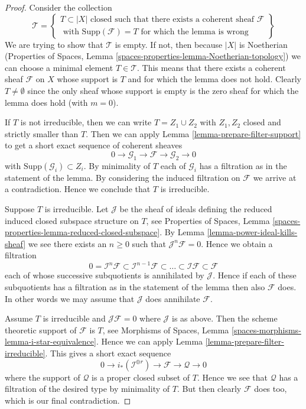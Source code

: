 \documentclass[10pt,a4paper]{amsart}
\theoremstyle{plain}
\theoremstyle{definition}
\theoremstyle{remark}
\numberwithin{equation}{subsection}
\begin{document}
\begin{proof}
Consider the collection
$$
\mathcal{T} =
\left\{
\begin{matrix}
T \subset |X|
\text{ closed such that there exists a coherent sheaf }
\mathcal{F} \\
\text{ with }
\text{Supp}(\mathcal{F}) = T
\text{ for which the lemma is wrong}
\end{matrix}
\right\}
$$
We are trying to show that $\mathcal{T}$ is empty. If not, then
because $|X|$ is Noetherian (Properties of Spaces, Lemma
\ref{spaces-properties-lemma-Noetherian-topology})
we can choose a minimal element $T \in \mathcal{T}$. This means that
there exists a coherent sheaf $\mathcal{F}$ on $X$ whose support is $T$
and for which the lemma does not hold. Clearly $T \not = \emptyset$ since
the only sheaf whose support is empty is the zero sheaf for which the
lemma does hold (with $m = 0$).

\medskip\noindent
If $T$ is not irreducible, then we can write $T = Z_1 \cup Z_2$
with $Z_1, Z_2$ closed and strictly smaller than $T$.
Then we can apply Lemma \ref{lemma-prepare-filter-support}
to get a short exact sequence of coherent sheaves
$$
0 \to
\mathcal{G}_1 \to
\mathcal{F} \to
\mathcal{G}_2 \to 0
$$
with $\text{Supp}(\mathcal{G}_i) \subset Z_i$. By minimality of
$T$ each of $\mathcal{G}_i$ has a filtration as in the statement
of the lemma. By considering the induced filtration on $\mathcal{F}$
we arrive at a contradiction. Hence we conclude
that $T$ is irreducible.

\medskip\noindent
Suppose $T$ is irreducible. Let $\mathcal{J}$ be the sheaf of ideals
defining the reduced induced closed subspace structure on $T$,
see Properties of Spaces, Lemma
\ref{spaces-properties-lemma-reduced-closed-subspace}.
By Lemma \ref{lemma-power-ideal-kills-sheaf} we see there exists
an $n \geq 0$ such that $\mathcal{J}^n\mathcal{F} = 0$. Hence we obtain
a filtration
$$
0 = \mathcal{I}^n\mathcal{F} \subset \mathcal{I}^{n - 1}\mathcal{F}
\subset \ldots \subset \mathcal{I}\mathcal{F} \subset \mathcal{F}
$$
each of whose successive subquotients is annihilated by $\mathcal{J}$.
Hence if each of these subquotients has a filtration as in the statement
of the lemma then also $\mathcal{F}$ does. In other words we may
assume that $\mathcal{J}$ does annihilate $\mathcal{F}$.

\medskip\noindent
Assume $T$ is irreducible and $\mathcal{J}\mathcal{F} = 0$ where
$\mathcal{J}$ is as above. Then the scheme theoretic support of
$\mathcal{F}$ is $T$, see
Morphisms of Spaces, Lemma \ref{spaces-morphisms-lemma-i-star-equivalence}.
Hence we can apply Lemma \ref{lemma-prepare-filter-irreducible}.
This gives a short exact sequence
$$
0 \to
i_*(\mathcal{I}^{\oplus r}) \to
\mathcal{F} \to
\mathcal{Q} \to 0
$$
where the support of $\mathcal{Q}$ is a proper closed subset of $T$.
Hence we see that $\mathcal{Q}$ has a filtration of the desired type
by minimality of $T$. But then clearly $\mathcal{F}$ does too, which is
our final contradiction.
\end{proof}
\end{document}
